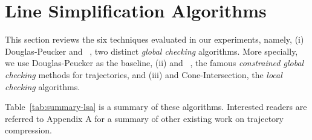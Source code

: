 \newtheorem{theorem}{Theorem}
\newtheorem{lemma}{Lemma}

\vspace{-1ex}
\section{Line Simplification Algorithms}
\label{sec-lsa}




This section reviews the six techniques evaluated in our experiments, namely,
(i) Douglas-Peucker\cite{Douglas:Peucker} and \pavlidis~\cite{Pavlidis:Segment}, two distinct \emph{global checking} algorithms.
More specially, we use Douglas-Peucker as the baseline,
(ii) \bqsa\cite{Liu:BQS} and \squishe~\cite{Muckell:SQUISH}, the famous \emph{constrained global checking} methods for trajectories, %
and (iii) \operb\cite{Lin:Operb} and Cone-Intersection\cite{Williams:Longest,Sklansky:Cone,Dunham:Cone, Zhao:Sleeve}, the \emph{local checking} algorithms.

Table~\ref{tab:summary-lsa} is a summary of these algorithms.
Interested readers are referred to Appendix A for a summary of other existing work on trajectory compression.


